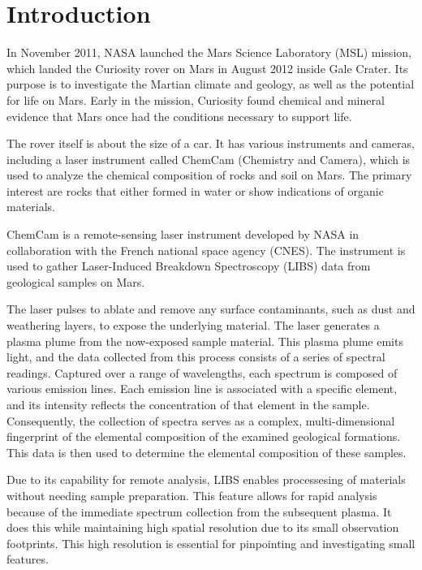 \section{Introduction}\label{sec:introduction}
In November 2011, NASA launched the Mars Science Laboratory (MSL) mission, which landed the Curiosity rover on Mars in August 2012 inside Gale Crater. Its purpose is to investigate the Martian climate and geology, as well as the potential for life on Mars.
Early in the mission, Curiosity found chemical and mineral evidence that Mars once had the conditions necessary to support life.\cite{chemcamNasaWebsite}

The rover itself is about the size of a car.
It has various instruments and cameras, including a laser instrument called ChemCam (Chemistry and Camera), which is used to analyze the chemical composition of rocks and soil on Mars.
The primary interest are rocks that either formed in water or show indications of organic materials.\cite{chemcamNasaWebsite}

ChemCam is a remote-sensing laser instrument developed by NASA in collaboration with the French national space agency (CNES).
The instrument is used to gather Laser-Induced Breakdown Spectroscopy (LIBS) data from geological samples on Mars.

The laser pulses to ablate and remove any surface contaminants, such as dust and weathering layers, to expose the underlying material. The laser generates a plasma plume from the now-exposed sample material.
This plasma plume emits light, and the data collected from this process consists of a series of spectral readings. Captured over a range of wavelengths, each spectrum is composed of various emission lines. Each emission line is associated with a specific element, and its intensity reflects the concentration of that element in the sample.
Consequently, the collection of spectra serves as a complex, multi-dimensional fingerprint of the elemental composition of the examined geological formations.
This data is then used to determine the elemental composition of these samples.\cite{cleggRecalibrationMarsScience2017}

Due to its capability for remote analysis, LIBS enables processesing of materials without needing sample preparation. This feature allows for rapid analysis because of the immediate spectrum collection from the subsequent plasma. It does this while maintaining high spatial resolution due to its small observation footprints. This high resolution is essential for pinpointing and investigating small features. \cite{wiensChemcam2012}


